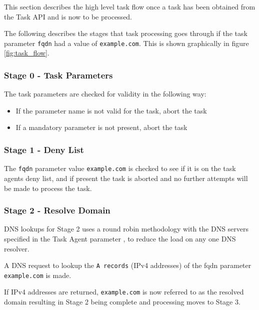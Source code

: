 \documentclass{mscreport}
\begin{document}
This section describes the high level task flow once a task has been obtained from the Task API and is now to be processed.

\vspace{0.3cm} \noindent
The following describes the stages that task processing goes through if the task parameter \texttt{fqdn} had a value of \texttt{example.com}. This is shown graphically in figure \ref{fig:task_flow}.

\subsubsection{Stage 0 - Task Parameters}

The task parameters are checked for validity in the following way:
\begin{itemize}
	\setlength\itemsep{0.1em}
    \item If the parameter name is not valid for the task, abort the task
    \item If a mandatory parameter is not present, abort the task
\end{itemize}

\subsubsection{Stage 1 - Deny List}

The \texttt{fqdn} parameter value \texttt{example.com} is checked to see if it is on the task agents deny list, and if present the task is aborted and no further attempts will be made to process the task.

\subsubsection{Stage 2 - Resolve Domain}

DNS lookups for Stage 2 uses a round robin methodology with the DNS servers specified in the Task Agent parameter \texttt{}, to reduce the load on any one DNS resolver.

\vspace{0.3cm} \noindent
A DNS request to lookup the \texttt{A records} (IPv4 addresses) of the fqdn parameter \texttt{example.com} is made.

\vspace{0.3cm} \noindent
If IPv4 addresses are returned, \texttt{example.com} is now referred to as the resolved domain resulting in Stage 2 being complete and processing moves to Stage 3.
\end{document}
